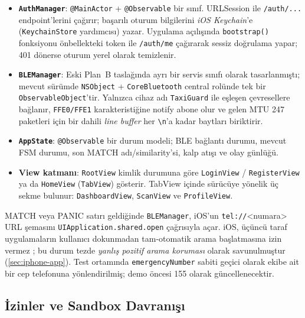 \begin{itemize}
    \item \textbf{\texttt{AuthManager}}: \texttt{@MainActor} +
          \texttt{@Observable} bir sınıf. URLSession ile \texttt{/auth/...}
          endpoint'lerini çağırır; başarılı oturum bilgilerini
          \emph{iOS Keychain}'e (\texttt{KeychainStore} yardımcısı)
          yazar. Uygulama açılışında \texttt{bootstrap()} fonksiyonu
          önbellekteki token ile \texttt{/auth/me} çağırarak sessiz
          doğrulama yapar; 401 dönerse oturum yerel olarak temizlenir.
    \item \textbf{\texttt{BLEManager}}: Eski Plan~B taslağında ayrı bir
          servis sınıfı olarak tasarlanmıştı; mevcut sürümde \texttt{NSObject}
          + \texttt{CoreBluetooth} central rolünde tek bir
          \texttt{ObservableObject}'tir. Yalnızca cihaz adı \texttt{TaxiGuard}
          ile eşleşen çevresellere bağlanır, \texttt{FFE0/FFE1}
          karakteristiğine notify abone olur ve gelen MTU 247 paketleri
          için bir dahili \emph{line buffer} her \texttt{\textbackslash n}'a
          kadar baytları biriktirir.
    \item \textbf{\texttt{AppState}}: \texttt{@Observable} bir durum
          modeli; BLE bağlantı durumu, mevcut FSM durumu, son MATCH
          adı/similarity'si, kalp atışı ve olay günlüğü.
    \item \textbf{View katmanı}: \texttt{RootView} kimlik durumuna göre
          \texttt{LoginView} / \texttt{RegisterView} ya da \texttt{HomeView}
          (\texttt{TabView}) gösterir. TabView içinde sürücüye yönelik
          üç sekme bulunur: \texttt{DashboardView}, \texttt{ScanView} ve
          \texttt{ProfileView}.
\end{itemize}

MATCH veya PANIC satırı geldiğinde \texttt{BLEManager}, iOS'un
\texttt{tel://}<numara> URL şemasını \texttt{UIApplication.shared.open}
çağrısıyla açar. iOS, üçüncü taraf uygulamaların kullanıcı dokunmadan
tam-otomatik arama başlatmasına izin vermez \cite{apple_tel_url}; bu
durum tezde \emph{yanlış pozitif arama koruması} olarak savunulmuştur
(\ref{sec:iphone-app}). Test ortamında \texttt{emergencyNumber}
sabiti geçici olarak ekibe ait bir cep telefonuna yönlendirilmiş;
demo öncesi 155 olarak güncellenecektir.

\subsection{İzinler ve Sandbox Davranışı}

